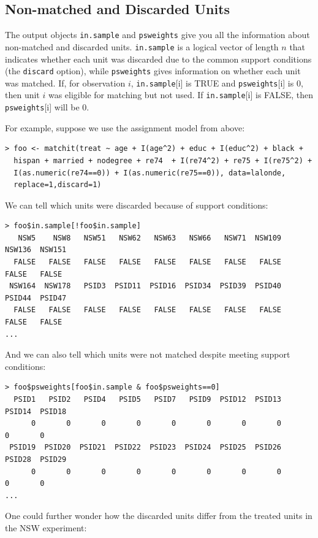 \documentclass[oneside,letterpaper,titlepage]{article}
\begin{document}
\subsection{Non-matched and Discarded Units}
The output objects \texttt{in.sample} and \texttt{psweights} give you
all the information about non-matched and discarded units.
\texttt{in.sample} is a logical vector of length $n$ that indicates whether each unit
was discarded due to the common support conditions (the
\texttt{discard} option), while \texttt{psweights} gives information
on whether each unit was matched.  If, for observation $i$,
\texttt{in.sample}[i] is TRUE and \texttt{psweights}[i] is $0$, then
unit $i$ was eligible for matching but not used.  If
\texttt{in.sample}[i] is FALSE, then \texttt{psweights}[i] will be $0$.

For example, suppose we use the assignment model from above:

\begin{verbatim}
> foo <- matchit(treat ~ age + I(age^2) + educ + I(educ^2) + black +
  hispan + married + nodegree + re74  + I(re74^2) + re75 + I(re75^2) +
  I(as.numeric(re74==0)) + I(as.numeric(re75==0)), data=lalonde,
  replace=1,discard=1)
\end{verbatim}

We can tell which units were discarded because of support conditions:

\begin{verbatim}
> foo$in.sample[!foo$in.sample]
   NSW5    NSW8   NSW51   NSW62   NSW63   NSW66   NSW71  NSW109  NSW136  NSW151
  FALSE   FALSE   FALSE   FALSE   FALSE   FALSE   FALSE   FALSE   FALSE   FALSE
 NSW164  NSW178   PSID3  PSID11  PSID16  PSID34  PSID39  PSID40  PSID44  PSID47
  FALSE   FALSE   FALSE   FALSE   FALSE   FALSE   FALSE   FALSE   FALSE   FALSE
...
\end{verbatim}

And we can also tell which units were not matched despite meeting
support conditions:

\begin{verbatim}
> foo$psweights[foo$in.sample & foo$psweights==0]
  PSID1   PSID2   PSID4   PSID5   PSID7   PSID9  PSID12  PSID13  PSID14  PSID18
      0       0       0       0       0       0       0       0       0       0
 PSID19  PSID20  PSID21  PSID22  PSID23  PSID24  PSID25  PSID26  PSID28  PSID29
      0       0       0       0       0       0       0       0       0       0
...
\end{verbatim}

One could further wonder how the discarded units differ from the
treated units in the NSW experiment:
\end{document}
